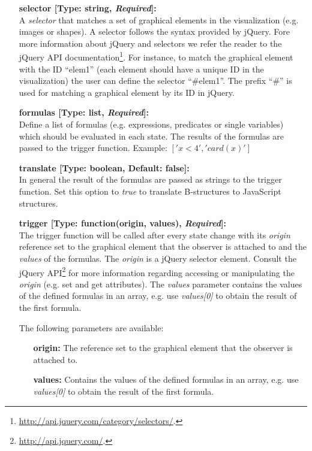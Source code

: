 \begin{itemize}

	\item[] \textbf{selector [Type: string, \textit{Required}]:}\\ A \textit{selector} that matches a set of graphical elements in the visualization (e.g. images or shapes). 
A selector follows the syntax provided by jQuery.
Fore more information about jQuery and selectors we refer the reader to the jQuery API documentation\footnote{\url{http://api.jquery.com/category/selectors/}.}. 
For instance, to match the graphical element with the ID ``elem1'' (each element should have a unique ID in the visualization) the user can define the selector ``\#elem1''.
The prefix ``\#'' is used for matching a graphical element by its ID in jQuery.

\item[] \textbf{formulas [Type: list, \textit{Required}]:}\\
Define a list of formulas (e.g. expressions, predicates or single variables) which should be evaluated in each state.
The results of the formulas are passed to the trigger function.
Example: $['x < 4', 'card(x)']$

\item[] \textbf{translate [Type: boolean, Default: false]:}\\
In general the result of the formulas are passed as strings to the trigger function.
Set this option to \textit{true} to translate B-structures to JavaScript structures.

\item[] \textbf{trigger [Type: function(origin, values), \textit{Required}]:}\\
The trigger function will be called after every state change with its \textit{origin} reference set to the graphical element that the observer is attached to and the \textit{values} of the formulas. 
The \textit{origin} is a jQuery selector element.
Consult the jQuery API\footnote{\url{http://api.jquery.com/}.} for more information regarding accessing or manipulating the \textit{origin} (e.g. set and get attributes).
The \textit{values} parameter contains the values of the defined formulas in an array, e.g. use \textit{values[0]} to obtain the result of the first formula.

The following parameters are available:

\begin{itemize}
	\item[\textbf{origin:}] The reference set to the graphical element that the observer is attached to.
	\item[\textbf{values:}] Contains the values of the defined formulas in an array, e.g. use \textit{values[0]} to obtain the result of the first formula.
\end{itemize}
 
\end{itemize}

